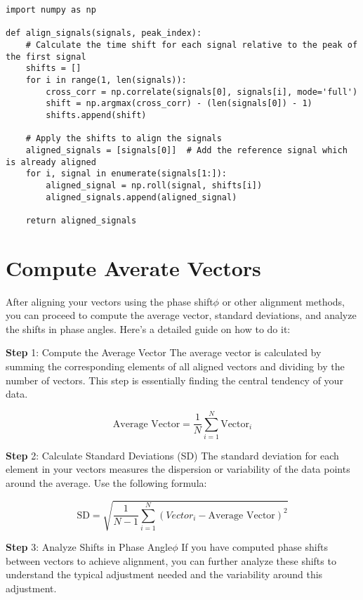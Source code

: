 \documentclass[twocolumn]{article}
\begin{document}
\begin{lstlisting}[style=Python]
import numpy as np

def align_signals(signals, peak_index):
    # Calculate the time shift for each signal relative to the peak of the first signal
    shifts = []
    for i in range(1, len(signals)):
        cross_corr = np.correlate(signals[0], signals[i], mode='full')
        shift = np.argmax(cross_corr) - (len(signals[0]) - 1)
        shifts.append(shift)

    # Apply the shifts to align the signals
    aligned_signals = [signals[0]]  # Add the reference signal which is already aligned
    for i, signal in enumerate(signals[1:]):
        aligned_signal = np.roll(signal, shifts[i])
        aligned_signals.append(aligned_signal)

    return aligned_signals
\end{lstlisting}



\section{Compute Averate Vectors}
After aligning your vectors using the phase shift$\phi$  or other alignment methods, you can proceed to compute the average vector, standard deviations, and analyze the shifts in phase angles. Here's a detailed guide on how to do it:

\noindent \textbf{Step } 1: Compute the Average Vector
The average vector is calculated by summing the corresponding elements of all aligned vectors and dividing by the number of vectors. This step is essentially finding the central tendency of your data.

\[
\text{Average Vector} = \frac{1}{N} \sum_{i=1}^{N} \text{Vector}_i
\]

\noindent \textbf{Step } 2: Calculate Standard Deviations (SD)
The standard deviation for each element in your vectors measures the dispersion or variability of the data points around the average. Use the following formula:

\[
\text{SD} = \sqrt{\frac{1}{N-1} \sum_{i=1}^{N} (Vector_i - \text{Average Vector})^2}
\]

\noindent \textbf{Step } 3: Analyze Shifts in Phase Angle$\phi$ 
If you have computed phase shifts between vectors to achieve alignment, you can further analyze these shifts to understand the typical adjustment needed and the variability around this adjustment.
\end{document}
